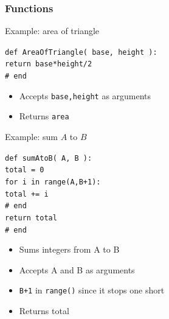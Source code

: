 \documentclass{beamer}
\newcommand{\code}[1]{\texttt{#1}}
\newcommand{\tab}{\hspace*{22pt}}
\begin{document}
\begin{frame}%
	\frametitle{Functions}
	
	\begin{block}{Example: area of triangle}
			
			
			\code{def AreaOfTriangle( base, height ): \\
    			\tab return base*height/2 \\
			\# end
			}
			
			
		\endminipage\hfill
			\begin{itemize}				
				\item Accepts \code{base,height} as arguments
				\item Returns \code{area}
			\end{itemize}
		\endminipage\hfill
	\end{block}
	
	\begin{block}{Example: sum $A$ to $B$}
			
			
			\code{def sumAtoB( A, B ): \\
    			\tab total = 0 \\
    			\tab for i in range(A,B+1): \\
        		\tab \tab total += i \\
    			\tab \# end \\
    			\tab return total \\
			\# end
			}
			
			
		\endminipage\hfill
			\begin{itemize}
				\item Sums integers from A to B
				\item Accepts A and B as arguments
				\item \code{B+1} in \code{range()} since it stops one short
				\item Returns total
			\end{itemize}
		\endminipage\hfill
	\end{block}
	
\end{frame}
\end{document}
